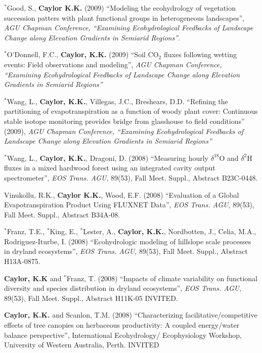 \documentclass[10pt]{article}
\begin{document}
\begin{etaremune}
\item  $^{*}$Good, S., \textbf{Caylor K.K.} (2009) ``Modeling the ecohydrology of vegetation succession patters with plant functional groups in heterogeneous landscapes'', \emph{AGU Chapman Conference, ``Examining Ecohydrological Feedbacks of Landscape Change along Elevation Gradients in Semiarid Regions''}.

\item  $^{*}$O'Donnell, F.C., \textbf{Caylor, K.K.} (2009) ``Soil CO$_{2}$ fluxes following wetting events: Field observations and modeling'', \emph{AGU Chapman Conference, ``Examining Ecohydrological Feedbacks of Landscape Change along Elevation Gradients in Semiarid Regions''}

\item $^{*}$Wang, L., \textbf{Caylor, K.K.}, Villegas, J.C., Breshears, D.D. ``Refining the partitioning of evapotranspiration as a function of woody plant cover: Continuous stable isotope monitoring provides bridge from glasshouse to field conditions'' (2009), \emph{AGU Chapman Conference, ``Examining Ecohydrological Feedbacks of Landscape Change along Elevation Gradients in Semiarid Regions''}

\item $^{*}$Wang, L., \textbf{Caylor, K.K.}, Dragoni, D. (2008) ``Measuring hourly  $\delta^{18}$O and  $\delta^{2}$H fluxes in a mixed hardwood forest using an integrated cavity output spectrometer'', \emph{EOS Trans. AGU}, 89(53), Fall Meet. Suppl., Abstract B23C-0448.

\item Vinukollu, R.K., \textbf{Caylor K.K.}, Wood, E.F. (2008) ``Evaluation of a Global Evapotranspiration Product Using FLUXNET Data'', \emph{EOS Trans. AGU}, 89(53), Fall Meet. Suppl., Abstract B34A-08.

\item  $^{*}$Franz, T.E., $^{*}$King, E., $^{*}$Lester, A., \textbf{Caylor, K.K.}, Nordbotten, J., Celia, M.A., Rodriguez-Iturbe, I. (2008) ``Ecohydrologic modeling of hillslope scale processes in dryland ecosystems'', \emph{EOS Trans. AGU}, 89(53), Fall Meet. Suppl., Abstract H13A-0875.

\item \textbf{Caylor, K.K} and $^{*}$Franz, T. (2008) ``Impacts of climate variability on functional diversity and species distribution in dryland ecosystems'', \emph{EOS Trans. AGU}, 89(53), Fall Meet. Suppl., Abstract H11K-05 INVITED.

\item \textbf{Caylor, K.K.} and Scanlon, T.M. (2008) ``Characterizing facilitative/competitive effects of tree canopies on herbaceous productivity: A coupled energy/water balance perspective'', International Ecohydrology/ Ecophysiology Workshop, University of Western Australia, Perth.  INVITED


\end{etaremune}
\end{document}
